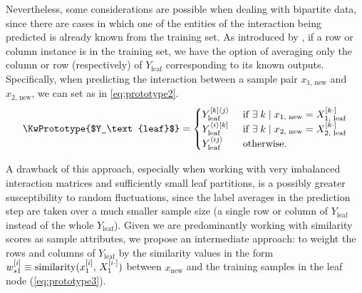 Nevertheless, some considerations are possible when dealing with bipartite data, since there are cases in which one of the entities of the interaction being predicted is already known from the training set. As introduced by \textcite{pliakos2018global}, if a row or column instance is in the training set, we have the option of averaging only the column or row (respectively) of $Y_\text{leaf}$ corresponding to its known outputs. Specifically, when predicting the interaction between a sample pair $x_{1\text{, new}}$ and $x_{2\text{, new}}$, we can set \KwPrototype as in \autoref{eq:prototype2}.
\begin{equation}
    \KwPrototype{$Y_\text{leaf}$} =
    \begin{cases}
        Y_\text{leaf}^{[k]\ang{j}} & \text{ if }
            \exists \; k \mid x_{1\text{, new}} = X_{1\text{, leaf}}\el{k\cdot}\\
        Y_\text{leaf}^{\ang{i}[k]} & \text{ if }
            \exists \; k \mid x_{2\text{, new}} = X_{2\text{, leaf}}\el{k\cdot}\\
        Y_\text{leaf}\mel{ij} & \text{ otherwise.}
    \end{cases}
    \label{eq:prototype2}
\end{equation}

A drawback of this approach, especially when working with very imbalanced interaction matrices and sufficiently small leaf partitions, is a possibly greater susceptibility to random fluctuations, since the label averages in the prediction step are taken over a much smaller sample size (a single row or column of $Y_\text{leaf}$ instead of the whole $Y_\text{leaf}$). Given we are predominantly working with similarity scores as sample attributes, we propose an intermediate approach: to weight the rows and columns of $Y_\text{leaf}$ by the similarity values in the form $w_{s1}^{[i]} \equiv \text{similarity}(x_1^{[i]}, \, X_1^{[i\cdot]})$ between $x_\text{new}$ and the training samples in the leaf node (\autoref{eq:prototype3}).

